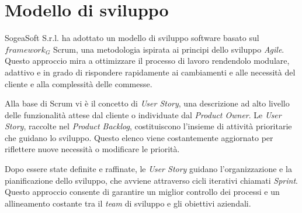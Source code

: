     \section{Modello di sviluppo}
    SogeaSoft S.r.l. ha adottato un modello di sviluppo software basato sul \textit{$framework_G$} Scrum, una metodologia ispirata ai principi dello sviluppo \textit{Agile}. Questo approccio mira a ottimizzare il processo di lavoro rendendolo modulare, adattivo e in grado di rispondere rapidamente ai cambiamenti e alle necessità del cliente e alla complessità delle commesse.  

    \vspace{0.2 em}
    
    \noindent Alla base di Scrum vi è il concetto di \textit{User Story}, una descrizione ad alto livello delle funzionalità attese dal cliente o individuate dal \textit{Product Owner}. Le \textit{User Story}, raccolte nel \textit{Product Backlog}, costituiscono l'insieme di attività prioritarie che guidano lo sviluppo. Questo elenco viene costantemente aggiornato per riflettere nuove necessità o modificare le priorità.
    
    \vspace{0.2 em}
    \noindent Dopo essere state definite e raffinate, le \textit{User Story} guidano l'organizzazione e la pianificazione dello sviluppo, che avviene attraverso cicli iterativi chiamati \textit{Sprint}. Questo approccio consente di garantire un miglior controllo dei processi e un allineamento costante tra il \textit{team} di sviluppo e gli obiettivi aziendali. 


